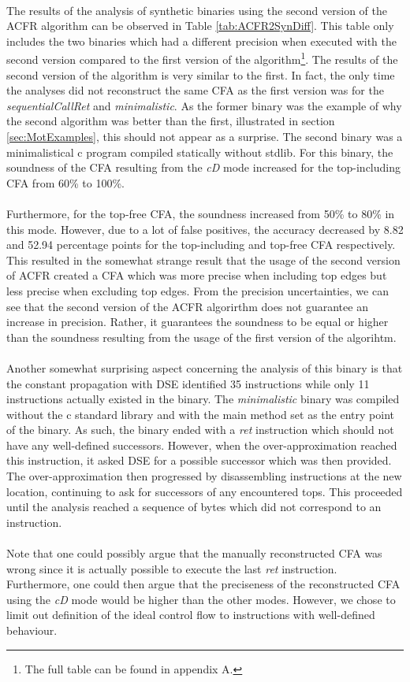 \documentclass{kththesis}
\renewcommand{\it}[1]{\textit{#1}}
\begin{document}
\noindent
\\
The results of the analysis of synthetic binaries using the second version of the ACFR algorithm can be observed in Table \ref{tab:ACFR2SynDiff}. This table only includes the two binaries which had a different precision when executed with the second version compared to the first version of the algorithm\footnote{The full table can be found in appendix A.}. The results of the second version of the algorithm is very similar to the first. In fact, the only time the analyses did not reconstruct the same CFA as the first version was for the  \it{sequentialCallRet} and \it{minimalistic}. As the former binary was the example of why the second algorithm was better than the first, illustrated in section \ref{sec:MotExamples}, this should not appear as a surprise. The second binary was a minimalistical c program compiled statically without stdlib. For this binary, the soundness of the CFA resulting from the \it{cD} mode increased for the top-including CFA from 60\% to 100\%.
\\ \\
Furthermore, for the top-free CFA, the soundness increased from 50\% to 80\% in this mode. However, due to a lot of false positives, the accuracy decreased by 8.82 and 52.94 percentage points for the top-including and top-free CFA respectively. This resulted in the somewhat strange result that the usage of the second version of ACFR created a CFA which was more precise when including top edges but less precise when excluding top edges. From the precision uncertainties, we can see that the second version of the ACFR algorirthm does not guarantee an increase in precision. Rather, it guarantees the soundness to be equal or higher than the soundness resulting from the usage of the first version of the algorihtm.
\\ \\
Another somewhat surprising aspect concerning the analysis of this binary is that the constant propagation with DSE identified 35 instructions while only 11 instructions actually existed in the binary. The \it{minimalistic} binary was compiled without the c standard library and with the main method set as the entry point of the binary. As such, the binary ended with a \it{ret} instruction which should not have any well-defined successors. However, when the over-approximation reached this instruction, it asked DSE for a possible successor which was then provided. The over-approximation then progressed by disassembling instructions at the new location, continuing to ask for successors of any encountered tops. This proceeded until the analysis reached a sequence of bytes which did not correspond to an instruction.
\\ \\
Note that one could possibly argue that the manually reconstructed CFA was wrong since it is actually possible to execute the last \it{ret} instruction. Furthermore, one could then argue that the preciseness of the reconstructed CFA using the \it{cD} mode would be higher than the other modes. However, we chose to limit out definition of the ideal control flow to instructions with well-defined behaviour. 
\end{document}
